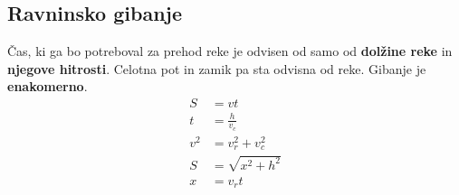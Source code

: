 {\color{indiagreen}\subsection{Ravninsko gibanje}}
Čas, ki ga bo potreboval za prehod reke je odvisen od samo od \textbf{dolžine reke} in \textbf{njegove hitrosti}. Celotna pot in zamik pa sta odvisna od reke. Gibanje je \textbf{enakomerno}.\\

\begin{align*}
	S &= vt\\
	t &= \frac{h}{v_c}\\ 
	v^2 &= v_r^2 +v_c^2\\
	S &= \sqrt{x^2 + h^2}\\
	x &= v_r t
\end{align*}